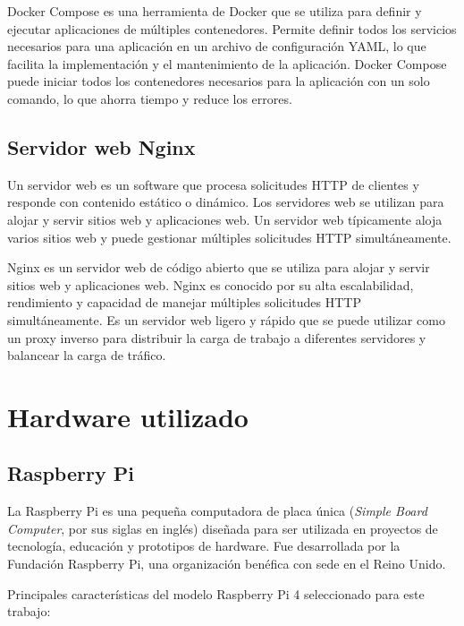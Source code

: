 Docker Compose \cite{WEBSITE:docker-compose} es una herramienta de Docker que se utiliza para definir y ejecutar aplicaciones de múltiples contenedores. Permite definir todos los servicios necesarios para una aplicación en un archivo de configuración YAML, lo que facilita la implementación y el mantenimiento de la aplicación. Docker Compose puede iniciar todos los contenedores necesarios para la aplicación con un solo comando, lo que ahorra tiempo y reduce los errores.

\subsection{Servidor web Nginx}
\label{subsec:servidorweb}

Un servidor web es un software que procesa solicitudes HTTP de clientes y responde con contenido estático o dinámico. Los servidores web se utilizan para alojar y servir sitios web y aplicaciones web. Un servidor web típicamente aloja varios sitios web y puede gestionar múltiples solicitudes HTTP simultáneamente.

Nginx \cite{WEBSITE:NGINX} es un servidor web de código abierto que se utiliza para alojar y servir sitios web y aplicaciones web. Nginx es conocido por su alta escalabilidad, rendimiento y capacidad de manejar múltiples solicitudes HTTP simultáneamente. Es un servidor web ligero y rápido que se puede utilizar como un proxy inverso para distribuir la carga de trabajo a diferentes servidores y balancear la carga de tráfico.

\section{Hardware utilizado}
\label{sec:hardware}

\subsection{Raspberry Pi}
\label{subsec:rbpi}

La Raspberry Pi \cite{WEBSITE:raspberrypi} es una pequeña computadora de placa única (\textit{Simple Board Computer}, por sus siglas en inglés) diseñada para ser utilizada en proyectos de tecnología, educación y prototipos de hardware. Fue desarrollada por la Fundación Raspberry Pi, una organización benéfica con sede en el Reino Unido.

Principales características del modelo Raspberry Pi 4 seleccionado para este trabajo:

